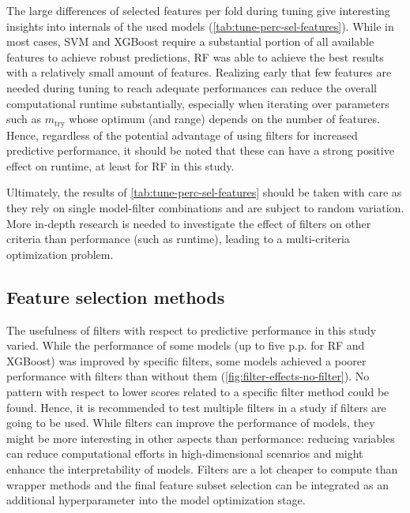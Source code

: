 \documentclass[journal]{IEEEtran}
\begin{document}
The large differences of selected features per fold during tuning give interesting insights into internals of the used models (\autoref{tab:tune-perc-sel-features}).
While in most cases, SVM and XGBoost require a substantial portion of all available features to achieve robust predictions, RF was able to achieve the best results with a relatively small amount of features.
Realizing early that few features are needed during tuning to reach adequate performances can reduce the overall computational runtime substantially, especially when iterating over parameters such as $m_\textrm{try}$ whose optimum (and range) depends on the number of features.
Hence, regardless of the potential advantage of using filters for increased predictive performance, it should be noted that these can have a strong positive effect on runtime, at least for RF in this study.

Ultimately, the results of \autoref{tab:tune-perc-sel-features} should be taken with care as they rely on single model-filter combinations and are subject to random variation.
More in-depth research is needed to investigate the effect of filters on other criteria than performance (such as runtime), leading to a multi-criteria optimization problem.

\subsection{Feature selection methods}

The usefulness of filters with respect to predictive performance in this study varied.
While the performance of some models (up to five p.p. for RF and XGBoost) was improved by specific filters, some models achieved a poorer performance with filters than without them (\autoref{fig:filter-effects-no-filter}).
No pattern with respect to lower scores related to a specific filter method could be found.
Hence, it is recommended to test multiple filters in a study if filters are going to be used.
While filters can improve the performance of models, they might be more interesting in other aspects than performance: reducing variables can reduce computational efforts in high-dimensional scenarios and might enhance the interpretability of models.
Filters are a lot cheaper to compute than wrapper methods and the final feature subset selection can be integrated as an additional hyperparameter into the model optimization stage.
\end{document}
